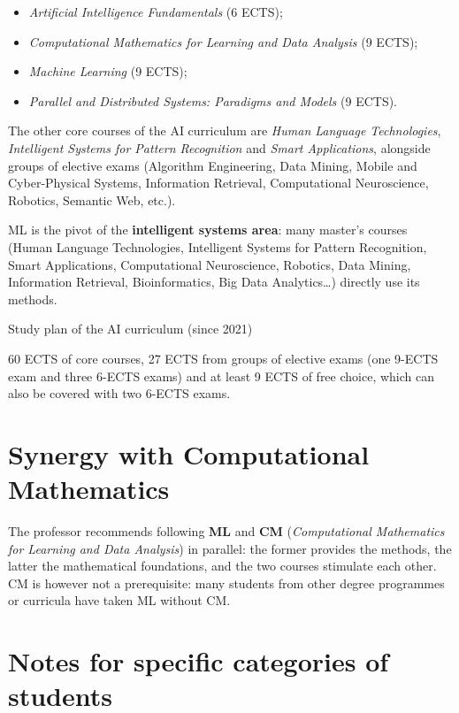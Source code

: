 \begin{itemize}
\tightlist
\item
  \emph{Artificial Intelligence Fundamentals} (6 ECTS);
\item
  \emph{Computational Mathematics for Learning and Data Analysis} (9
  ECTS);
\item
  \emph{Machine Learning} (9 ECTS);
\item
  \emph{Parallel and Distributed Systems: Paradigms and Models} (9
  ECTS).
\end{itemize}

The other core courses of the AI curriculum are \emph{Human Language
Technologies}, \emph{Intelligent Systems for Pattern Recognition} and
\emph{Smart Applications}, alongside groups of elective exams
(Algorithm Engineering, Data Mining, Mobile and Cyber-Physical Systems,
Information Retrieval, Computational Neuroscience, Robotics, Semantic
Web, etc.).

ML is the pivot of the \textbf{intelligent systems area}: many master's
courses (Human Language Technologies, Intelligent Systems for Pattern
Recognition, Smart Applications, Computational Neuroscience, Robotics,
Data Mining, Information Retrieval, Bioinformatics, Big Data
Analytics\ldots) directly use its methods.

\begin{boxnote}{Study plan of the AI curriculum (since 2021)}

60 ECTS of core courses, 27 ECTS from groups of elective exams (one
9-ECTS exam and three 6-ECTS exams) and at least 9 ECTS of free choice,
which can also be covered with two 6-ECTS exams.

\end{boxnote}

\section{Synergy with Computational
Mathematics}\label{sinergia-con-computational-mathematics}

The professor recommends following \textbf{ML} and \textbf{CM}
(\emph{Computational Mathematics for Learning and Data Analysis}) in
parallel: the former provides the methods, the latter the mathematical
foundations, and the two courses stimulate each other. CM is however
not a prerequisite: many students from other degree programmes or
curricula have taken ML without CM.

\section{Notes for specific categories of
students}\label{note-per-categorie-particolari-di-studenti}

